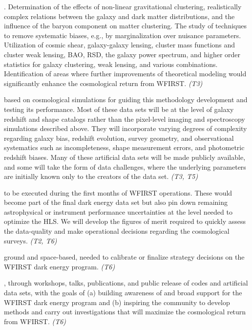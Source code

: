 . 
Determination of the effects of non-linear gravitational clustering, realistically complex relations between the
galaxy and dark matter distributions, and the influence of the baryon
component on matter clustering. 
The study of techniques to
remove systematic biases, e.g., by marginalization over nuisance
parameters. 
Utilization of cosmic shear,
galaxy-galaxy lensing, cluster mass functions and cluster weak lensing, BAO, RSD, the galaxy
power spectrum, and higher order statistics for galaxy clustering, weak
lensing, and various combinations.
Identification of areas where
further improvements of theoretical modeling would significantly
enhance the cosmological return from WFIRST. \textit{(T3)}

 based on cosmological simulations for
guiding this methodology development and testing its performance.
Most of these data sets will be at the level of galaxy redshift and shape
catalogs rather than the pixel-level imaging and spectroscopy simulations
described above.  They will incorporate varying degrees of complexity
regarding galaxy bias, redshift evolution, survey geometry, and
observational systematics such as incompleteness, shape measurement errors,
and photometric redshift biases.  Many of these artificial data sets
will be made publicly available, and some will take the form of data
challenges, where the underlying parameters are initially known only
to the creators of the data set. \textit{(T3, T5)}

 to be executed during the first
months of WFIRST operations. These would become part of the final
dark energy data set but also pin down remaining astrophysical or
instrument performance uncertainties at the level needed to optimize 
the HLS. We will develop the figures of merit required to quickly
assess the data-quality and make operational decisions regarding the
cosmological surveys. \textit{(T2, T6)}

ground and space-based, needed to calibrate or finalize 
strategy decisions on the WFIRST dark energy program. \textit{(T6)}

, through workshops,
talks, publications, and public release of codes and artificial data sets, with the
goals of (a) building awareness of and broad support for the WFIRST
dark energy program and (b) inspiring the community to develop methods
and carry out investigations that will maximize the cosmological
return from WFIRST. \textit{(T6)}

